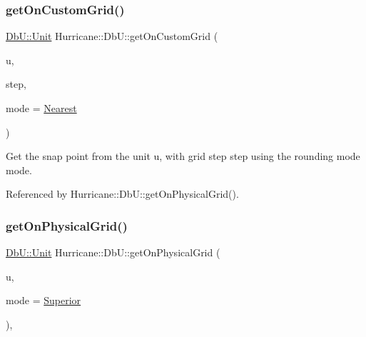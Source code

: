\subsubsection{\texorpdfstring{get\+On\+Custom\+Grid()}{getOnCustomGrid()}}
{\footnotesize\ttfamily \mbox{\hyperlink{group__DbUGroup_ga4fbfa3e8c89347af76c9628ea06c4146}{Db\+U\+::\+Unit}} Hurricane\+::\+Db\+U\+::get\+On\+Custom\+Grid (\begin{DoxyParamCaption}\item[{\mbox{\hyperlink{group__DbUGroup_ga4fbfa3e8c89347af76c9628ea06c4146}{Db\+U\+::\+Unit}}}]{u,  }\item[{\mbox{\hyperlink{group__DbUGroup_ga4fbfa3e8c89347af76c9628ea06c4146}{Db\+U\+::\+Unit}}}]{step,  }\item[{\mbox{\hyperlink{group__DbUGroup_ga1082168d6f9956ebba22ab8bbec21637}{Db\+U\+::\+Snap\+Mode}}}]{mode = {\ttfamily \mbox{\hyperlink{group__DbUGroup_gga1082168d6f9956ebba22ab8bbec21637a65e6f47eb16779b8974a80d6145a2db5}{Nearest}}} }\end{DoxyParamCaption})\hspace{0.3cm}{\ttfamily [static]}}

Get the snap point from the unit {\ttfamily u}, with grid step {\ttfamily step} using the rounding mode {\ttfamily mode}. 

Referenced by Hurricane\+::\+Db\+U\+::get\+On\+Physical\+Grid().

\mbox{\label{group__DbUGroup_ga9419025221579f4277475c65655be3dc}} 
\subsubsection{\texorpdfstring{get\+On\+Physical\+Grid()}{getOnPhysicalGrid()}}
{\footnotesize\ttfamily \mbox{\hyperlink{group__DbUGroup_ga4fbfa3e8c89347af76c9628ea06c4146}{Db\+U\+::\+Unit}} Hurricane\+::\+Db\+U\+::get\+On\+Physical\+Grid (\begin{DoxyParamCaption}\item[{\mbox{\hyperlink{group__DbUGroup_ga4fbfa3e8c89347af76c9628ea06c4146}{Db\+U\+::\+Unit}}}]{u,  }\item[{\mbox{\hyperlink{group__DbUGroup_ga1082168d6f9956ebba22ab8bbec21637}{Db\+U\+::\+Snap\+Mode}}}]{mode = {\ttfamily \mbox{\hyperlink{group__DbUGroup_gga1082168d6f9956ebba22ab8bbec21637a8ce92cf7ff7627c46baf85612f9ad847}{Superior}}} }\end{DoxyParamCaption})\hspace{0.3cm}{\ttfamily [inline]}, {\ttfamily [static]}}

